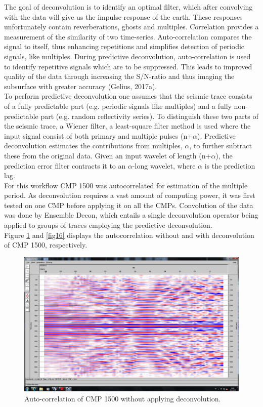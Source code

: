 \documentclass[10pt,a4paper]{article}
\begin{document}
\noindent The goal of deconvolution is to identify an optimal filter, which after convolving with the data will give us the impulse response of the earth. These responses unfortunately contain reverberations, ghosts and multiples. Correlation provides a measurement of the similarity of two time-series. Auto-correlation compares the signal to itself, thus enhancing repetitions and simplifies detection of periodic signals, like multiples. During predictive deconvolution, auto-correlation is used to identify repetitive signals which are to be suppressed. This leads to improved quality of the data through increasing the S/N-ratio and thus imaging the subsurface with greater accuracy (Gelius, 2017a). 
\\
To perform predictive deconvolution one assumes that the seismic trace consists of a fully predictable part (e.g. periodic signals like multiples) and a fully non-predictable part (e.g. random reflectivity series). To distinguish these two parts of the seismic trace, a Wiener filter, a least-square filter method is used where the input signal consist of both primary and multiple pulses (n+$\alpha$). Predictive deconvolution estimates the contributions from multiples, $\alpha$, to further subtract these from the original data. Given an input wavelet of length (n+$\alpha$), the prediction error filter contracts it to an $\alpha$-long wavelet, where $\alpha$ is the prediction lag. 
\\
For this workflow CMP 1500 was autocorrelated for estimation of the multiple period. As deconvolution requires a vast amount of computing power, it was first tested on one CMP before applying it on all the CMPs. Convolution of the data was done by Ensemble Decon, which entails a single deconvolution operator being applied to groups of traces employing the predictive deconvolution.
\\
Figure \ref{fig15} and \ref{fig16} displays the autocorrelation without and with deconvolution of CMP 1500, respectively.


\begin{figure}[H]
\centering
\includegraphics[width=\textwidth, trim={2cm 4cm 1cm 2cm},clip]{fig15.jpg}
\caption{Auto-correlation of CMP 1500 without applying deconvolution.}
\label{fig15}
\end{figure}
\end{document}
